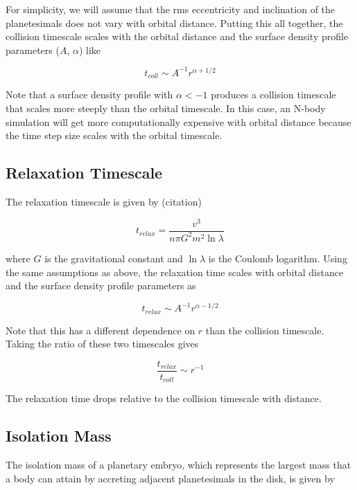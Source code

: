 \documentclass[onecolumn]{aastex63}
\begin{document}
\noindent For simplicity, we will assume that the rms eccentricity and inclination of the planetesimals does not vary with orbital distance. Putting this all together, the collision timescale scales with the orbital distance and the surface density profile parameters ($A$, $\alpha$) like

\begin{equation}
	t_{coll} \sim A^{-1} r^{\alpha + 1/2}
\end{equation}

\noindent Note that a surface density profile with $\alpha < -1$ produces a collision timescale that scales more steeply than the orbital timescale. In this case, an N-body simulation will get more computationally expensive with orbital distance because the time step size scales with the orbital timescale.

\subsection{Relaxation Timescale}

The relaxation timescale is given by (citation)

\begin{equation}
    t_{relax} = \frac{v^3}{n \pi G^{2} m^{2} \ln \lambda}
\end{equation}

\noindent where $G$ is the gravitational constant and $\ln \lambda$ is the Coulomb logarithm. Using the same assumptions as above, the relaxation time scales with orbital distance and the surface density profile parameters as

\begin{equation}
    t_{relax} \sim A^{-1} r^{\alpha - 1/2}
\end{equation}

Note that this has a different dependence on $r$ than the collision timescale. Taking the ratio of these two timescales gives

\begin{equation}
\frac{t_{relax}}{t_{coll}} \sim r^{-1}
\end{equation}

The relaxation time drops relative to the collision timescale with distance.

\subsection{Isolation Mass}

The isolation mass of a planetary embryo, which represents the largest mass that a body can attain by accreting adjacent planetesimals in the disk, is given by
\end{document}
